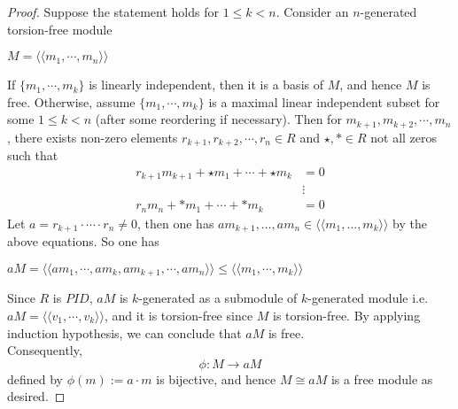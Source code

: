\documentclass[12pt]{amsbook}
\begin{document}
\begin{proof}
    Suppose the statement holds for $1\leq k< n$. Consider an $n$-generated torsion-free module 
    \begin{center}
        $M=\langle\langle m_1,\cdots,m_n\rangle\rangle$
    \end{center}
    If $\{m_1,\cdots,m_k\}$ is linearly independent, then it is a basis of $M$, and hence $M$ is free. Otherwise, assume $\{m_1,\cdots,m_k\}$ is a maximal linear independent subset for some $1\leq k < n$ (after some reordering if necessary).
    Then for $m_{k+1},m_{k+2},\cdots,m_{n}$, there exists non-zero elements $r_{k+1},r_{k+2}, \cdots, r_{n}\in R$ and $\star, \ast \in R$ not all zeros such that
    \begin{align*}
        r_{k+1}m_{k+1}+{\star}m_1+\cdots +{\star}m_{k} &=0 \\
         &\vdots \\
        r_nm_n+ {\ast }m_1+\cdots + {\ast }m_{k} &=0
    \end{align*}
    Let $a=r_{k+1}\cdot\cdots\cdot r_n\neq0$, then one has $am_{k+1}, \dots, am_n \in \langle \langle m_1, \dots, m_k \rangle \rangle$ by the above equations. So one has
    \begin{center}
        $aM = \langle\langle am_1,\cdots, am_k, am_{k+1},\cdots, am_n\rangle\rangle\leq\langle\langle m_1,\cdots,m_k\rangle\rangle$
    \end{center}
    Since $R$ is $PID$, $aM$ is $k$-generated as a submodule of $k$-generated module i.e. $aM =\langle\langle v_1,\cdots,v_k\rangle\rangle$, and it is torsion-free since $M$ is torsion-free. By applying induction hypothesis, we can conclude that $aM$ is free.\\
    Consequently, 
    $$\phi: M \to aM$$
    defined by $\phi(m) := a\cdot m$ is bijective, and hence $M \cong aM$ is a free module as desired.
\end{proof}
\end{document}
